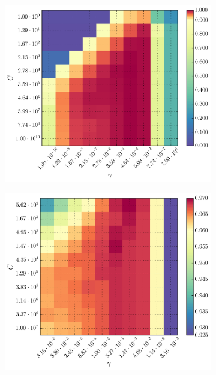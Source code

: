 \begin{figure}[ht!]
	\centering
	\begin{subfigure}[t]{0.49\textwidth}
		\centering
		\includegraphics[width=\textwidth]{figures/gridsearch/svm/superclasses/svm-superclasses-01.png}
	\end{subfigure}
	\begin{subfigure}[t]{0.49\textwidth}
		\centering
		\includegraphics[width=\textwidth]{figures/gridsearch/svm/superclasses/svm-superclasses-02.png}

\end{subfigure}
\end{figure}
